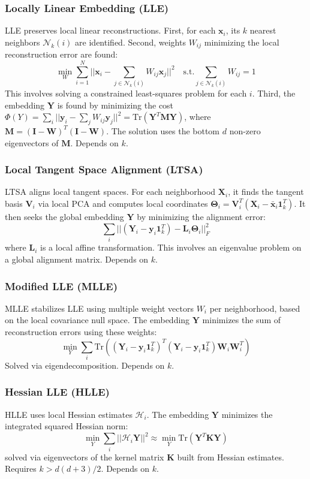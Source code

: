 \documentclass{article}
\begin{document}
\subsubsection{Locally Linear Embedding (LLE)}
LLE \citep{Roweis2000} preserves local linear reconstructions. First, for each $\mathbf{x}_i$, its $k$ nearest neighbors $\mathcal{N}_k(i)$ are identified. Second, weights $W_{ij}$ minimizing the local reconstruction error are found:
\[ \min_{W} \sum_{i=1}^N ||\mathbf{x}_i - \sum_{j \in \mathcal{N}_k(i)} W_{ij} \mathbf{x}_j||^2 \quad \text{s.t.} \sum_{j \in \mathcal{N}_k(i)} W_{ij} = 1 \]
This involves solving a constrained least-squares problem for each $i$. Third, the embedding $\mathbf{Y}$ is found by minimizing the cost $\Phi(Y) = \sum_i ||\mathbf{y}_i - \sum_{j} W_{ij} \mathbf{y}_j||^2 = \text{Tr}(\mathbf{Y}^T \mathbf{M} \mathbf{Y})$, where $\mathbf{M} = (\mathbf{I}-\mathbf{W})^T(\mathbf{I}-\mathbf{W})$. The solution uses the bottom $d$ non-zero eigenvectors of $\mathbf{M}$. Depends on $k$.

\subsubsection{Local Tangent Space Alignment (LTSA)}
LTSA \citep{Zhang2004} aligns local tangent spaces. For each neighborhood $\mathbf{X}_i$, it finds the tangent basis $\mathbf{V}_i$ via local PCA and computes local coordinates $\mathbf{\Theta}_i = \mathbf{V}_i^T (\mathbf{X}_i - \bar{\mathbf{x}}_i \mathbf{1}_k^T)$. It then seeks the global embedding $\mathbf{Y}$ by minimizing the alignment error:
\[ \sum_i || (\mathbf{Y}_i - \mathbf{y}_i\mathbf{1}_k^T) - \mathbf{L}_i \mathbf{\Theta}_i ||_F^2 \]
where $\mathbf{L}_i$ is a local affine transformation. This involves an eigenvalue problem on a global alignment matrix. Depends on $k$.

\subsubsection{Modified LLE (MLLE)}
MLLE \citep{Zhang2007} stabilizes LLE using multiple weight vectors $W_i$ per neighborhood, based on the local covariance null space. The embedding $\mathbf{Y}$ minimizes the sum of reconstruction errors using these weights:
\[ \min_{Y} \sum_{i} \text{Tr}( (\mathbf{Y}_i - \mathbf{y}_i \mathbf{1}_k^T)^T (\mathbf{Y}_i - \mathbf{y}_i \mathbf{1}_k^T) \mathbf{W}_i \mathbf{W}_i^T ) \]
Solved via eigendecomposition. Depends on $k$.

\subsubsection{Hessian LLE (HLLE)}
HLLE \citep{Donoho2003} uses local Hessian estimates $\mathcal{H}_i$. The embedding $\mathbf{Y}$ minimizes the integrated squared Hessian norm:
\[ \min_{Y} \sum_i || \mathcal{H}_i \mathbf{Y} ||^2 \approx \min_{Y} \text{Tr}(\mathbf{Y}^T \mathbf{K} \mathbf{Y}) \]
solved via eigenvectors of the kernel matrix $\mathbf{K}$ built from Hessian estimates. Requires $k > d(d+3)/2$. Depends on $k$.
\end{document}
